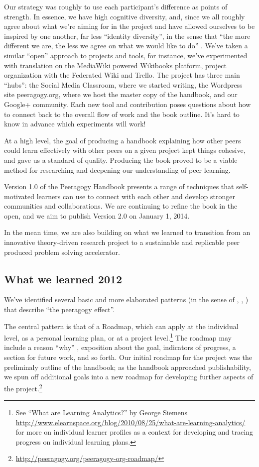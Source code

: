 \documentclass{acm_proc_article-sp}
\begin{document}
Our strategy was roughly to use each participant's difference as
points of strength.  In essence, we have high cognitive diversity,
and, since we all roughly agree about what we're aiming for in the
project and have allowed ourselves to be inspired by one another, far
less ``identity diversity'', in the sense that ``the more different we
are, the less we agree on what we would like to do''
\cite{Page2008difference}.  We've taken a similar ``open'' approach to
projects and tools, for instance, we've experimented with translation
on the MediaWiki powered Wikibooks platform, project organization with
the Federated Wiki and Trello.  The project has three main ``hubs'':
the Social Media Classroom, where we started writing, the Wordpress
site peeragogy.org, where we host the master copy of the handbook, and
our Google+ community.  Each new tool and contribution poses questions
about how to connect back to the overall flow of work and the book
outline.  It's hard to know in advance which experiments will work!

At a high level, the goal of producing a handbook explaining how other
peers could learn effectively with other peers on a given project kept
things cohesive, and gave us a standard of quality.  Producing the
book proved to be a viable method for researching and deepening our
understanding of peer learning.

Version 1.0 of the Peeragogy Handbook presents a range of techniques
that self-motivated learners can use to connect with each other and
develop stronger communities and collaborations.  We are continuing to
refine the book in the open, and we aim to publish Version 2.0 on
January 1, 2014.

In the mean time, we are also building on what we learned to
transition from an innovative theory-driven research project to a
sustainable and replicable peer produced problem solving accelerator.

\subsection{What we learned 2012}

We've identified several basic and more elaborated patterns (in the
sense of \cite{Origins}, \cite{Tales}, \cite{vlissides1995design})
that describe ``the peeragogy effect''.

The central pattern is that of a Roadmap, which can apply at the
individual level, as a personal learning plan, or at a project
level.\footnote{See ``What are Learning Analytics?'' by George Siemens
  \url{http://www.elearnspace.org/blog/2010/08/25/what-are-learning-analytics/}
  for more on individual learner profiles as a context for developing
  and tracing progress on individual learning plans.}  The roadmap may
include a reason ``why'' \cite{sinek2009start}, exposition about the
goal, indicators of progress, a section for future work, and so forth.
Our initial roadmap for the project was the preliminaly outline of the
handbook; as the handbook approached publishability, we spun off
additional goals into a new roadmap for developing further aspects of
the project.\footnote{\url{http://peeragogy.org/peeragogy-org-roadmap/}}
\end{document}
